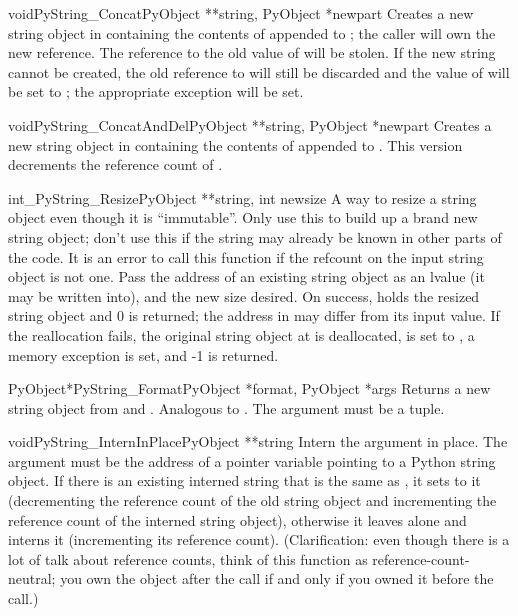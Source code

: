 \begin{cfuncdesc}{void}{PyString_Concat}{PyObject **string,
                                         PyObject *newpart}
  Creates a new string object in  containing the contents
  of  appended to ; the caller will own the
  new reference.  The reference to the old value of  will
  be stolen.  If the new string cannot be created, the old reference
  to  will still be discarded and the value of
   will be set to \NULL; the appropriate exception will
  be set.
\end{cfuncdesc}

\begin{cfuncdesc}{void}{PyString_ConcatAndDel}{PyObject **string,
                                               PyObject *newpart}
  Creates a new string object in  containing the contents
  of  appended to .  This version decrements
  the reference count of .
\end{cfuncdesc}

\begin{cfuncdesc}{int}{_PyString_Resize}{PyObject **string, int newsize}
  A way to resize a string object even though it is ``immutable''.
  Only use this to build up a brand new string object; don't use this
  if the string may already be known in other parts of the code.  It
  is an error to call this function if the refcount on the input string
  object is not one.
  Pass the address of an existing string object as an lvalue (it may
  be written into), and the new size desired.  On success, 
  holds the resized string object and 0 is returned; the address in
   may differ from its input value.  If the
  reallocation fails, the original string object at  is
  deallocated,  is set to \NULL{}, a memory exception is set,
  and -1 is returned.
\end{cfuncdesc}

\begin{cfuncdesc}{PyObject*}{PyString_Format}{PyObject *format,
                                              PyObject *args}
  Returns a new string object from  and .
  Analogous to .  The 
  argument must be a tuple.
\end{cfuncdesc}

\begin{cfuncdesc}{void}{PyString_InternInPlace}{PyObject **string}
  Intern the argument  in place.  The argument must be
  the address of a pointer variable pointing to a Python string
  object.  If there is an existing interned string that is the same as
  , it sets  to it (decrementing the
  reference count of the old string object and incrementing the
  reference count of the interned string object), otherwise it leaves
   alone and interns it (incrementing its reference
  count).  (Clarification: even though there is a lot of talk about
  reference counts, think of this function as reference-count-neutral;
  you own the object after the call if and only if you owned it before
  the call.)
\end{cfuncdesc}

